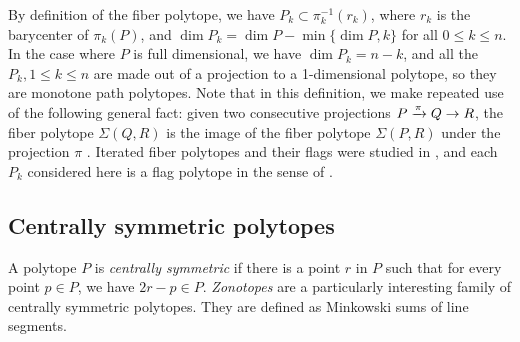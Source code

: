 By definition of the fiber polytope, we have $P_k \subset \pi_k^{-1}(r_k)$, where $r_k$ is the barycenter of $\pi_k(P)$, and $\dim P_k = \dim P - \min\{ \dim P,k\}$ for all $0\leq k \leq n$.
In the case where $P$ is full dimensional, we have $\dim P_k = n-k$, and all the $P_k, 1 \leq k \leq n$ are made out of a projection to a 1-dimensional polytope, so they are monotone path polytopes.
Note that in this definition, we make repeated use of the following general fact: given two consecutive projections $P \xrightarrow{\pi} Q \to R$, the fiber polytope $\Sigma(Q,R)$ is the image of the fiber polytope $\Sigma(P,R)$ under the projection $\pi$ \cite[Lemma 2.3]{BilleraSturmfels92}.
Iterated fiber polytopes and their flags were studied in \cite{BilleraSturmfels94}, and each $P_k$ considered here is a flag polytope in the sense of \cite[Section 3]{BilleraSturmfels94}.






\subsection{Centrally symmetric polytopes} \label{ss:centrally-symmetric}

A polytope $P$ is \emph{centrally symmetric} if there is a point $r$ in $P$ such that for every point $p \in P$, we have $2r-p \in P$.
\emph{Zonotopes} are a particularly interesting family of centrally symmetric polytopes. 
They are defined as Minkowski sums of line segments. 

